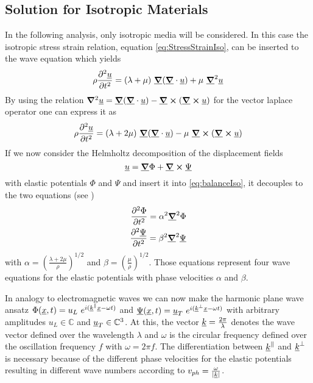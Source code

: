 
\subsection{Solution for Isotropic Materials}
In the following analysis, only isotropic media will be considered. In this
case the isotropic stress strain relation, equation
\ref{eq:StressStrainIso}, can be inserted to the wave equation which
yields
\begin{equation}
    \rho \ddiff{\uline{u}}{t} = (\lambda + \mu)\ \uline{\gradient}
    (\uline{\gradient}\cdot \uline{u}) + \mu\ \uline{\gradient}^2 \uline{u}
\end{equation}
By using the relation $\gradient^2 \uline u = \uline{\gradient}
    (\uline{\gradient}\cdot \uline{u}) - \uline{\gradient}
    \cross(\uline{\gradient} \cross \uline{u})$ for the vector laplace operator
one can express it as
\begin{equation} \label{eq:balanceIso}
    \rho \ddiff{\uline{u}}{t} = (\lambda + 2\mu)\ \uline{\gradient}
    (\uline{\gradient}\cdot \uline{u})- \mu\ \uline{\grad }
    \cross (\uline{\gradient}\cross \uline{u})
\end{equation}
If we now consider the Helmholtz decomposition of the displacement fields
\begin{equation} \label{eq:Helmholtz}
    \uline{u} = \uline{\gradient}\Phi + \uline{\gradient}\cross \uline{\Psi}
\end{equation}
with elastic potentials $\Phi$ and $\Psi$ and insert it into
\ref{eq:balanceIso},
it decouples to the two equations (see \cite{BedfordElasticWaves})
\begin{align}
    \ddiff{\Phi}{t} = \alpha^2 \uline{\gradient}^2\Phi \\
    \ddiff{\uline{\Psi}}{t} = \beta^2 \uline{\gradient}^2\uline{\Psi}
\end{align}
with $\alpha = \left(\frac{\lambda + 2\mu}{\rho}\right)^{1/2}$ and $\beta =
    \left(\frac{\mu}{\rho}\right)^{1/2}$. Those equations represent four wave
equations for the elastic potentials with phase velocities $\alpha$ and
$\beta$.

In analogy to electromagnetic waves we can now make the harmonic
plane wave ansatz $\Phi(\underline{x}, t)= u_L\
    e^{i(\underline{k}^\Vert \underline{x}-\omega t)}$ and $\underline{\Psi}(\underline{x}, t)
    =
    \underline{u}_T \ e^{i(\underline{k}^\bot\underline{x}-\omega t)}$ with arbitrary
amplitudes $u_L\in\mathbb{C}$ and $\underline{u}_T\in \mathbb{C}^3$.
At this, the vector
$\underline{k}=\frac{2\pi}{\lambda}$ denotes the wave vector defined over the
wavelength $\lambda$ and $\omega$ is the circular frequency defined over the
oscillation frequency $f$ with	$\omega = 2 \pi f$. The differentiation between
$\underline{k}^\Vert$ and $\underline{k}^\bot$ is necessary because of the different
phase velocities for the elastic potentials resulting in different wave numbers
according to $v_{ph} = \frac{\omega}{|\underline{k}|}$.

